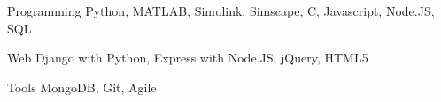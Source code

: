 


\begin{cvskills}


\cvskill
{Programming} %
{Python, MATLAB, Simulink, Simscape, C, Javascript, Node.JS, SQL} %


\cvskill
{Web} %
{Django with Python, Express with Node.JS, jQuery, HTML5} %


\cvskill
{Tools}
{MongoDB, Git, Agile}



\end{cvskills}